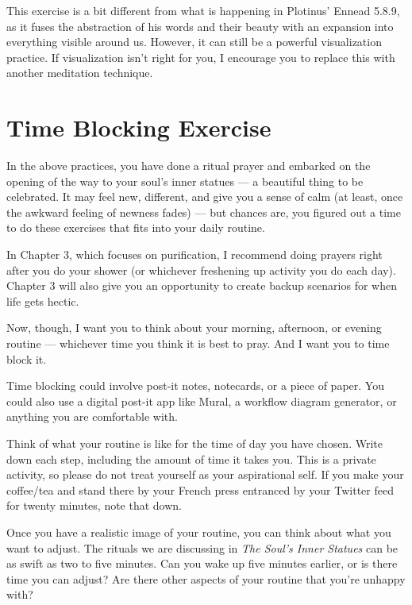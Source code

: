 \documentclass[
]{book}
\begin{document}
This exercise is a bit different from what is happening in Plotinus' Ennead 5.8.9, as it fuses the abstraction of his words and their beauty with an expansion into everything visible around us. However, it can still be a powerful visualization practice. If visualization isn't right for you, I encourage you to replace this with another meditation technique.

\hypertarget{time-blocking-exercise}{%
\section{Time Blocking Exercise}\label{time-blocking-exercise}}

In the above practices, you have done a ritual prayer and embarked on the opening of the way to your soul's inner statues --- a beautiful thing to be celebrated. It may feel new, different, and give you a sense of calm (at least, once the awkward feeling of newness fades) --- but chances are, you figured out a time to do these exercises that fits into your daily routine.

In Chapter 3, which focuses on purification, I recommend doing prayers right after you do your shower (or whichever freshening up activity you do each day). Chapter 3 will also give you an opportunity to create backup scenarios for when life gets hectic.

Now, though, I want you to think about your morning, afternoon, or evening routine --- whichever time you think it is best to pray. And I want you to time block it.

Time blocking could involve post-it notes, notecards, or a piece of paper. You could also use a digital post-it app like Mural, a workflow diagram generator, or anything you are comfortable with.

Think of what your routine is like for the time of day you have chosen. Write down each step, including the amount of time it takes you. This is a private activity, so please do not treat yourself as your aspirational self. If you make your coffee/tea and stand there by your French press entranced by your Twitter feed for twenty minutes, note that down.

Once you have a realistic image of your routine, you can think about what you want to adjust. The rituals we are discussing in \emph{The Soul's Inner Statues} can be as swift as two to five minutes. Can you wake up five minutes earlier, or is there time you can adjust? Are there other aspects of your routine that you're unhappy with?
\end{document}
